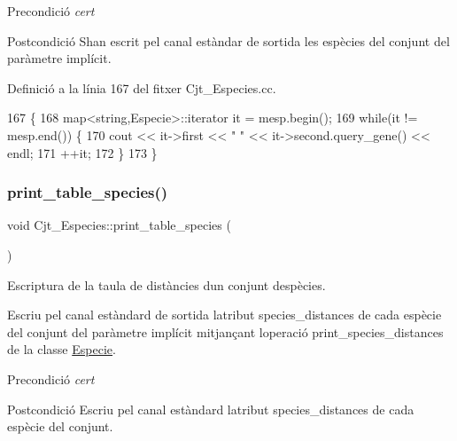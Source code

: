 \begin{DoxyPrecond}{Precondició}
{\itshape cert} 
\end{DoxyPrecond}
\begin{DoxyPostcond}{Postcondició}
S\textquotesingle{}han escrit pel canal estàndar de sortida les espècies del conjunt del paràmetre implícit. 
\end{DoxyPostcond}


Definició a la línia 167 del fitxer Cjt\+\_\+\+Especies.\+cc.


\begin{DoxyCode}
167                                  \{
168     map<string,Especie>::iterator it = mesp.begin();
169     \textcolor{keywordflow}{while}(it != mesp.end()) \{
170         cout << it->first << \textcolor{stringliteral}{" "} << it->second.query\_gene() << endl;
171         ++it;
172     \}
173 \}
\end{DoxyCode}
\mbox{\label{class_cjt___especies_ab6ebf81bf6ad734a970c3677fd4e5250}} 
\subsubsection{\texorpdfstring{print\+\_\+table\+\_\+species()}{print\_table\_species()}}
{\footnotesize\ttfamily void Cjt\+\_\+\+Especies\+::print\+\_\+table\+\_\+species (\begin{DoxyParamCaption}{ }\end{DoxyParamCaption})}



Escriptura de la taula de distàncies d\textquotesingle{}un conjunt d\textquotesingle{}espècies. 

Escriu pel canal estàndard de sortida l\textquotesingle{}atribut species\+\_\+distances de cada espècie del conjunt del paràmetre implícit mitjançant l\textquotesingle{}operació print\+\_\+species\+\_\+distances de la classe \hyperlink{class_especie}{Especie}.

\begin{DoxyPrecond}{Precondició}
{\itshape cert} 
\end{DoxyPrecond}
\begin{DoxyPostcond}{Postcondició}
Escriu pel canal estàndard l\textquotesingle{}atribut species\+\_\+distances de cada espècie del conjunt. 
\end{DoxyPostcond}


